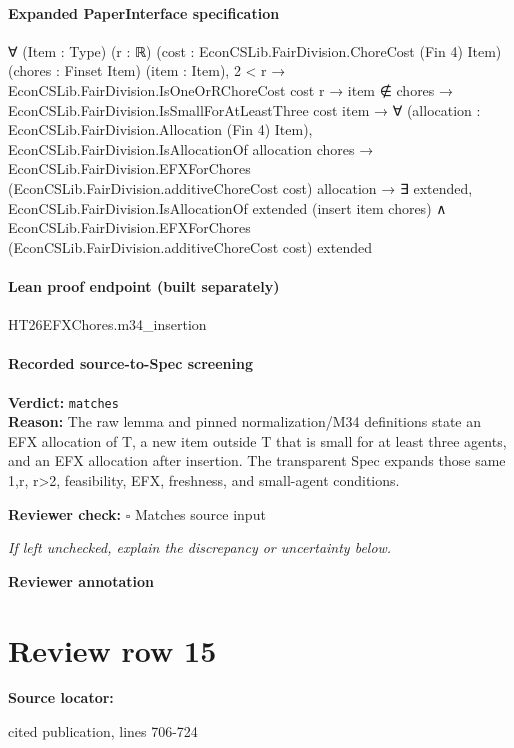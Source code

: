 \documentclass[10pt]{article}
\newcommand{\reviewerbox}{%
  \par\noindent\fbox{\parbox{0.96\linewidth}{\rule{0pt}{0.38in}}}\par
}
\newcommand{\reviewmatch}[1]{%
  \par\noindent\textbf{Reviewer check:} $\square$\; #1\par
  \noindent\emph{If left unchecked, explain the discrepancy or uncertainty below.}\par
}
\begin{document}
\paragraph{Expanded PaperInterface specification}
\begin{ReviewVerbatim}
∀ (Item : Type) (r : ℝ) (cost : EconCSLib.FairDivision.ChoreCost (Fin 4) Item) (chores : Finset Item) (item : Item),
  2 < r →
    EconCSLib.FairDivision.IsOneOrRChoreCost cost r →
      item ∉ chores →
        EconCSLib.FairDivision.IsSmallForAtLeastThree cost item →
          ∀ (allocation : EconCSLib.FairDivision.Allocation (Fin 4) Item),
            EconCSLib.FairDivision.IsAllocationOf allocation chores →
              EconCSLib.FairDivision.EFXForChores (EconCSLib.FairDivision.additiveChoreCost cost) allocation →
                ∃ extended,
                  EconCSLib.FairDivision.IsAllocationOf extended (insert item chores) ∧
                    EconCSLib.FairDivision.EFXForChores (EconCSLib.FairDivision.additiveChoreCost cost) extended
\end{ReviewVerbatim}

\paragraph{Lean proof endpoint (built separately)}\begin{ReviewVerbatim}
HT26EFXChores.m34_insertion
\end{ReviewVerbatim}

\paragraph{Recorded source-to-Spec screening}
\textbf{Verdict:} \texttt{matches}
\\
\textbf{Reason:} The raw lemma and pinned normalization/M34 definitions state an EFX allocation of T, a new item outside T that is small for at least three agents, and an EFX allocation after insertion. The transparent Spec expands those same 1,r, r>2, feasibility, EFX, freshness, and small-agent conditions.
\reviewmatch{Matches source input}
\noindent\textbf{Reviewer annotation}\par
\reviewerbox
\clearpage
\hypertarget{source-claim-58fb9c46acb21eca}{}
\section*{Review row 15}
\textbf{Source locator:} {\footnotesize\raggedright cited publication, lines 706-\allowbreak{}724\par}
\end{document}
